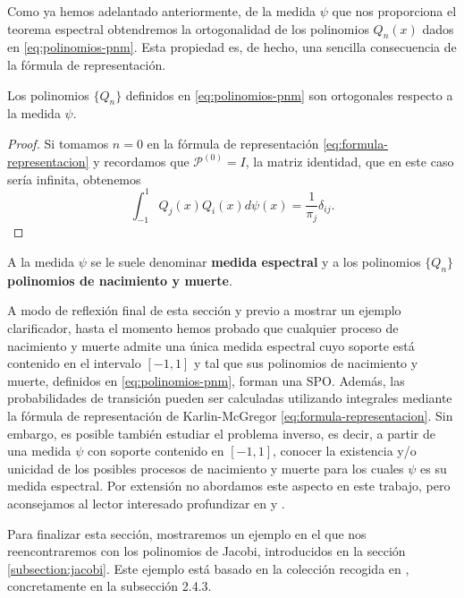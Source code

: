     Como ya hemos adelantado anteriormente, de la medida $\psi$ que nos proporciona el teorema espectral obtendremos la ortogonalidad de los polinomios $Q_n(x)$ dados en \eqref{eq:polinomios-pnm}. Esta propiedad es, de hecho, una sencilla consecuencia de la fórmula de representación.

    \begin{corolario}
        Los polinomios $\{Q_n\}$ definidos en \eqref{eq:polinomios-pnm} son ortogonales respecto a la medida $\psi$.
    \end{corolario}
    \begin{proof}
        Si tomamos $n=0$ en la fórmula de representación \eqref{eq:formula-representacion} y recordamos que $\mathcal{P}^{(0)}=I$, la matriz identidad, que en este caso sería infinita, obtenemos
        $$
        \int_{-1}^1 Q_j(x)Q_i(x)d\psi(x) = \frac{1}{\pi_j}\delta_{ij}.
        $$
    \end{proof}

    A la medida $\psi$ se le suele denominar \textbf{medida espectral} y a los polinomios $\{Q_n\}$ \textbf{polinomios de nacimiento y muerte}. 

    A modo de reflexión final de esta sección y previo a mostrar un ejemplo clarificador, hasta el momento hemos probado que cualquier proceso de nacimiento y muerte admite una única medida espectral cuyo soporte está contenido en el intervalo $[-1,1]$ y tal que sus polinomios de nacimiento y muerte, definidos en \eqref{eq:polinomios-pnm}, forman una SPO. Además, las probabilidades de transición pueden ser calculadas utilizando integrales mediante la fórmula de representación de Karlin-McGregor \eqref{eq:formula-representacion}. Sin embargo, es posible también estudiar el problema inverso, es decir, a partir de una medida $\psi$ con soporte contenido en $[-1,1]$, conocer la existencia y/o unicidad de los posibles procesos de nacimiento y muerte para los cuales $\psi$ es su medida espectral. Por extensión no abordamos este aspecto en este trabajo, pero aconsejamos al lector interesado profundizar en \cite[Section 2.2]{Manuel} y \cite{random-walks}.

    Para finalizar esta sección, mostraremos un ejemplo en el que nos reencontraremos con los polinomios de Jacobi, introducidos en la sección \ref{subsection:jacobi}. Este ejemplo está basado en la colección recogida en \cite[CH. II, Section 2.4]{Manuel}, concretamente en la subsección 2.4.3.

